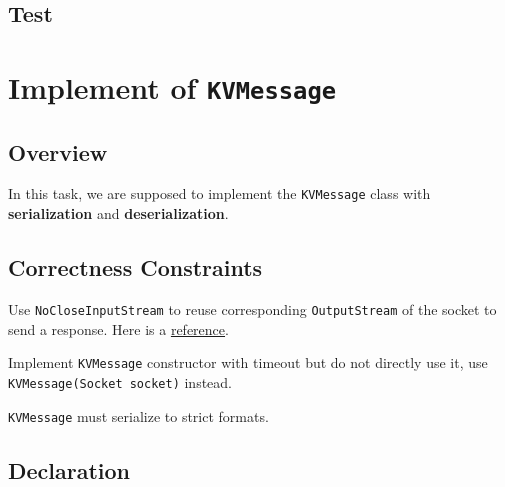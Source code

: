 \documentclass{article}
\begin{document}
\subsection{Test}


\section{Implement of \texttt{KVMessage}}
\subsection{Overview}
In this task, we are supposed to implement the \texttt{KVMessage} class with \textbf{serialization} and \textbf{deserialization}.

\subsection{Correctness Constraints}
\begin{compactitem}
	\item Use \texttt{NoCloseInputStream} to reuse corresponding \texttt{OutputStream} of the socket to send a response.
		Here is a \href{https://weblogs.java.net/blog/kohsuke/archive/2005/07/socket_xml_pitf.html}{reference}.
	\item Implement \texttt{KVMessage} constructor with timeout but do not directly use it, use \texttt{KVMessage(Socket socket)} instead.
	\item \texttt{KVMessage} must serialize to strict formats.
\end{compactitem}
\subsection{Declaration}
\end{document}
